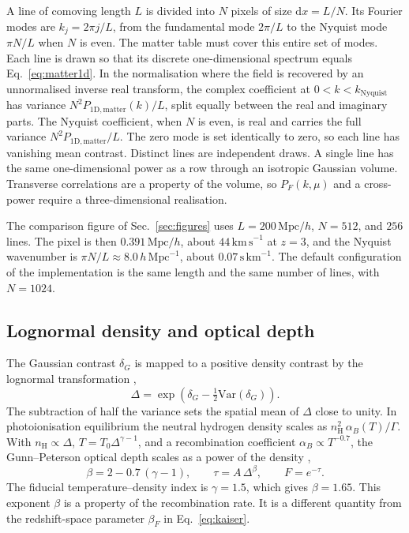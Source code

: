 \documentclass[11pt]{article}
\begin{document}
A line of comoving length $L$ is divided into $N$ pixels of size $\mathrm{d}x=L/N$.
Its Fourier modes are $k_j = 2\pi j/L$, from the fundamental mode $2\pi/L$ to the Nyquist mode $\pi N/L$ when $N$ is even.
The matter table must cover this entire set of modes.
Each line is drawn so that its discrete one-dimensional spectrum equals Eq.~\eqref{eq:matter1d}.
In the normalisation where the field is recovered by an unnormalised inverse real transform, the complex coefficient at $0<k<k_\mathrm{Nyquist}$ has variance $N^{2} P_{1\mathrm{D},\mathrm{matter}}(k)/L$, split equally between the real and imaginary parts.
The Nyquist coefficient, when $N$ is even, is real and carries the full variance $N^{2} P_{1\mathrm{D},\mathrm{matter}}/L$.
The zero mode is set identically to zero, so each line has vanishing mean contrast.
Distinct lines are independent draws.
A single line has the same one-dimensional power as a row through an isotropic Gaussian volume.
Transverse correlations are a property of the volume, so $P_F(k,\mu)$ and a cross-power require a three-dimensional realisation.

The comparison figure of Sec.~\ref{sec:figures} uses $L=200\,\mathrm{Mpc}/h$, $N=512$, and $256$ lines.
The pixel is then $0.391\,\mathrm{Mpc}/h$, about $44\,\mathrm{km\,s}^{-1}$ at $z=3$, and the Nyquist wavenumber is $\pi N/L \approx 8.0\,h\,\mathrm{Mpc}^{-1}$, about $0.07\,\mathrm{s\,km}^{-1}$.
The default configuration of the implementation is the same length and the same number of lines, with $N=1024$.

\subsection{Lognormal density and optical depth}
\label{sec:fgpa}

The Gaussian contrast $\delta_G$ is mapped to a positive density contrast by the lognormal transformation \citep{Coles:1991if,Bi:1996fh},
\begin{equation}
\label{eq:lognormal}
\Delta
=
\exp\!\left(\delta_G - \tfrac12 \mathrm{Var}(\delta_G)\right).
\end{equation}
The subtraction of half the variance sets the spatial mean of $\Delta$ close to unity.
In photoionisation equilibrium the neutral hydrogen density scales as $n_\mathrm{H}^{2}\,\alpha_B(T)/\Gamma$.
With $n_\mathrm{H}\propto\Delta$, $T=T_0\Delta^{\gamma-1}$, and a recombination coefficient $\alpha_B\propto T^{-0.7}$, the Gunn--Peterson optical depth scales as a power of the density \citep{Gunn:1965hd,Hui:1997dp},
\begin{equation}
\label{eq:fgpa}
\beta = 2 - 0.7\,(\gamma - 1),
\qquad
\tau = A\,\Delta^{\beta},
\qquad
F = e^{-\tau}.
\end{equation}
The fiducial temperature--density index is $\gamma=1.5$, which gives $\beta=1.65$.
This exponent $\beta$ is a property of the recombination rate.
It is a different quantity from the redshift-space parameter $\beta_F$ in Eq.~\eqref{eq:kaiser}.
\end{document}
